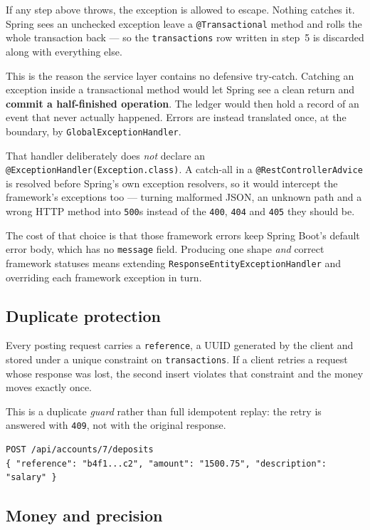 \documentclass[11pt,a4paper]{article}
\begin{document}
If any step above throws, the exception is allowed to escape. Nothing catches it. Spring sees an
unchecked exception leave a \texttt{@Transactional} method and rolls the whole transaction back ---
so the \texttt{transactions} row written in step~5 is discarded along with everything else.

This is the reason the service layer contains no defensive try-catch. Catching an exception inside
a transactional method would let Spring see a clean return and \textbf{commit a half-finished
operation}. The ledger would then hold a record of an event that never actually happened. Errors
are instead translated once, at the boundary, by \texttt{GlobalExceptionHandler}.

That handler deliberately does \emph{not} declare an \texttt{@ExceptionHandler(Exception.class)}.
A catch-all in a \texttt{@RestControllerAdvice} is resolved before Spring's own exception
resolvers, so it would intercept the framework's exceptions too --- turning malformed JSON, an
unknown path and a wrong HTTP method into \texttt{500}s instead of the \texttt{400},
\texttt{404} and \texttt{405} they should be.

The cost of that choice is that those framework errors keep Spring Boot's default error body,
which has no \texttt{message} field. Producing one shape \emph{and} correct framework statuses
means extending \texttt{ResponseEntityExceptionHandler} and overriding each framework exception
in turn.

\subsection{Duplicate protection}

Every posting request carries a \texttt{reference}, a UUID generated by the client and stored under
a unique constraint on \texttt{transactions}. If a client retries a request whose response was
lost, the second insert violates that constraint and the money moves exactly once.

This is a duplicate \emph{guard} rather than full idempotent replay: the retry is answered with
\texttt{409}, not with the original response.

\begin{lstlisting}
POST /api/accounts/7/deposits
{ "reference": "b4f1...c2", "amount": "1500.75", "description": "salary" }
\end{lstlisting}

\subsection{Money and precision}
\end{document}
